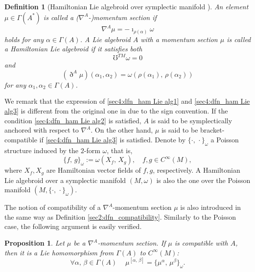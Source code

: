 \documentclass[a4paper,11pt,dvipdfmx]{article}
\newtheorem{prop}[thm]{Proposition}
\newtheorem{dfn}[thm]{Definition}
\numberwithin{equation}{section}
\begin{document}
\begin{dfn}[Hamiltonian Lie algebroid over symplectic manifold \cite{BWham18}]
An element $\mu\in \varGamma(A^*)$ is called a {\rm (}$\nabla^A$-{\rm )}momentum section if 
\begin{equation}\label{sec4:dfn_ham Lie alg1}
 \nabla^A\mu = -\imath_{\rho(\alpha)}\omega
\end{equation}
holds for any $\alpha\in\varGamma(A)$. A Lie algebroid $A$ with a momentum section $\mu$ is called a Hamiltonian Lie algebroid if it satisfies both 
\begin{equation}\label{sec4:dfn_ham Lie alg2}
\mho^{TM}\omega = 0
\end{equation}
and 
\begin{equation}\label{sec4:dfn_ham Lie alg3}
(\eth^A\mu)(\alpha_1,\alpha_2) = \omega(\rho(\alpha_1),\,\rho(\alpha_2))
\end{equation}
for any $\alpha_1,\alpha_2\in\varGamma(A)$. 
\end{dfn}

We remark that the expression of \eqref{sec4:dfn_ham Lie alg1} and \eqref{sec4:dfn_ham Lie alg3} is different from the original one in \cite{BWham18} due to the sign convention. 
If the condition \eqref{sec4:dfn_ham Lie alg2} is satisfied, $A$ is said to be symplectically anchored with respect to $\nabla^A$. 
On the other hand, $\mu$ is said to be bracket-compatible if \eqref{sec4:dfn_ham Lie alg3} is satisfied. 
Denote by $\{\cdot,\, \cdot\}_{\omega}$ a Poisson structure induced by the $2$-form $\omega$, that is, 
\[
\{f,\,g\}_{\omega}:= \omega(X_f,\,X_g),\quad f,g\in C^{\infty}(M), 
\]
where $X_f, X_g$ are Hamiltonian vector fields of $f, g$, respectively. 
A Hamiltonian Lie algebroid over a symplectic manifold $(M,\omega)$ is also the one over the Poisson manifold $(M,\{\cdot,\, \cdot\}_{\omega})$. 

The notion of compatibility of a $\nabla^A$-momentum section $\mu$ is also introduced in the same way as Definition \ref{sec2:dfn_compatibility}. 
Similarly to the Poisson case, the following argument is easily verified. 

\begin{prop}
Let $\mu$ be a $\nabla^A$-momentum section. If $\mu$ is compatible with $A$, then it is a Lie homomorphism from $\varGamma(A)$ to $C^{\infty}(M)${\rm :} 
\[
 \forall \alpha,\,\beta\in \varGamma(A)\ \quad \mu^{[\alpha,\,\beta]} = \{\mu^{\alpha},\,\mu^{\beta}\}_{\omega}. 
\]
\end{prop}
\medskip 
\end{document}
